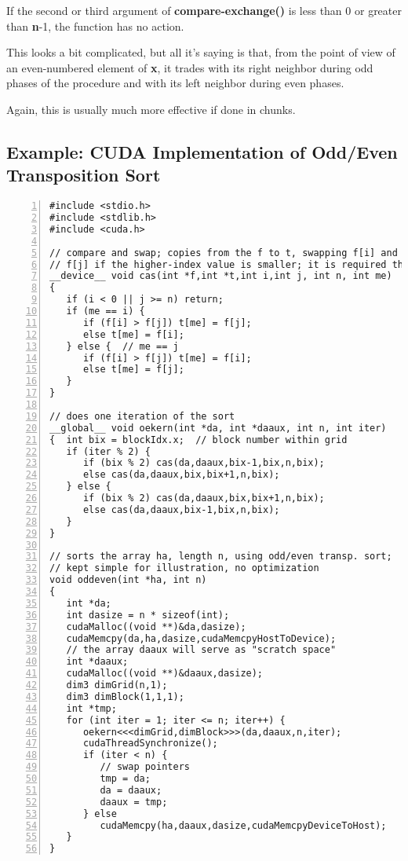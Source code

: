 If the second or third argument of {\bf compare-exchange()} is less than
0 or greater than {\bf n}-1, the function has no action.

This looks a bit complicated, but all it's saying is that, from the
point of view of an even-numbered element of {\bf x}, it trades with its
right neighbor during odd phases of the procedure and with its left
neighbor during even phases.

Again, this is usually much more effective if done in chunks.

\subsection{Example:  CUDA Implementation of Odd/Even Transposition Sort}
\label{cudaoddeven}

\begin{Verbatim}[fontsize=\relsize{-2},numbers=left]
#include <stdio.h>
#include <stdlib.h>
#include <cuda.h>

// compare and swap; copies from the f to t, swapping f[i] and
// f[j] if the higher-index value is smaller; it is required that i < j
__device__ void cas(int *f,int *t,int i,int j, int n, int me)
{  
   if (i < 0 || j >= n) return;
   if (me == i) {
      if (f[i] > f[j]) t[me] = f[j];
      else t[me] = f[i];
   } else {  // me == j
      if (f[i] > f[j]) t[me] = f[i];
      else t[me] = f[j];
   }
}

// does one iteration of the sort
__global__ void oekern(int *da, int *daaux, int n, int iter)
{  int bix = blockIdx.x;  // block number within grid
   if (iter % 2) { 
      if (bix % 2) cas(da,daaux,bix-1,bix,n,bix);
      else cas(da,daaux,bix,bix+1,n,bix);
   } else {
      if (bix % 2) cas(da,daaux,bix,bix+1,n,bix);
      else cas(da,daaux,bix-1,bix,n,bix);
   }
}

// sorts the array ha, length n, using odd/even transp. sort; 
// kept simple for illustration, no optimization 
void oddeven(int *ha, int n)
{
   int *da; 
   int dasize = n * sizeof(int);
   cudaMalloc((void **)&da,dasize);
   cudaMemcpy(da,ha,dasize,cudaMemcpyHostToDevice);
   // the array daaux will serve as "scratch space" 
   int *daaux;  
   cudaMalloc((void **)&daaux,dasize);
   dim3 dimGrid(n,1);
   dim3 dimBlock(1,1,1);
   int *tmp;
   for (int iter = 1; iter <= n; iter++) {
      oekern<<<dimGrid,dimBlock>>>(da,daaux,n,iter);
      cudaThreadSynchronize();
      if (iter < n) {
         // swap pointers
         tmp = da;
         da = daaux;
         daaux = tmp;
      } else
         cudaMemcpy(ha,daaux,dasize,cudaMemcpyDeviceToHost);
   }
}
\end{Verbatim}

